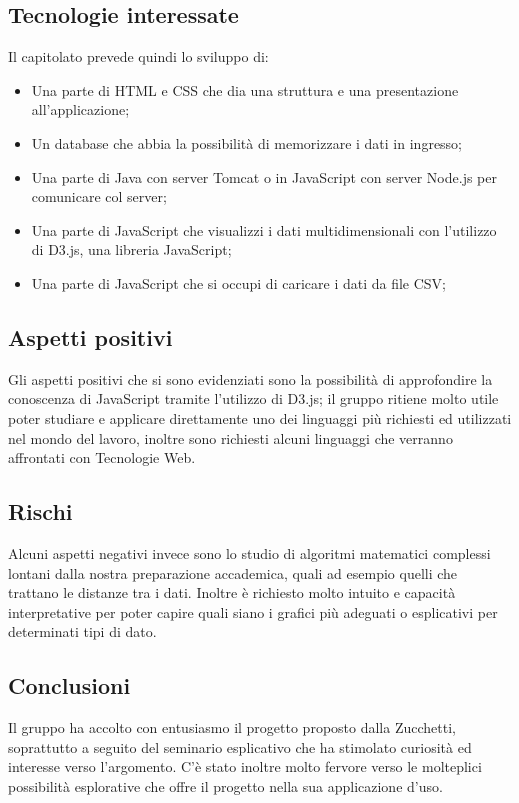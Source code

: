 \documentclass[../studio-di-fattibilita.tex]{subfiles}
\begin{document}
\subsection{Tecnologie interessate}%
\label{sub:c4_tecnologie_interessate}
Il capitolato prevede quindi lo sviluppo di:
\begin{itemize}
  \item Una parte di HTML e CSS che dia una struttura e una presentazione all’applicazione;
  \item Un database che abbia la possibilità di memorizzare i dati in ingresso;
  \item Una parte di Java con server Tomcat o in JavaScript con server Node.js per comunicare col server;
  \item Una parte di JavaScript che visualizzi i dati multidimensionali con l'utilizzo di D3.js, una libreria JavaScript;
  \item Una parte di JavaScript che si occupi di caricare i dati da file CSV;
\end{itemize}

\subsection{Aspetti positivi}%
\label{sub:c4_aspetti_positivi}
Gli aspetti positivi che si sono evidenziati sono la possibilità di approfondire la conoscenza di JavaScript tramite l’utilizzo di D3.js; il gruppo ritiene molto utile poter studiare e applicare direttamente uno dei linguaggi più richiesti ed utilizzati nel mondo del lavoro, inoltre sono richiesti alcuni linguaggi che verranno affrontati con Tecnologie Web.


\subsection{Rischi}%
\label{sub:c4_rischi}
Alcuni aspetti negativi invece sono lo studio di algoritmi matematici complessi lontani dalla nostra preparazione accademica, quali ad esempio quelli che trattano le distanze tra i dati. Inoltre è richiesto molto intuito e capacità interpretative per poter capire quali siano i grafici più adeguati o esplicativi per determinati tipi di dato.

\subsection{Conclusioni}%
\label{sub:c4_conclusioni}
Il gruppo ha accolto con entusiasmo il progetto proposto dalla Zucchetti, soprattutto a seguito del seminario esplicativo che ha stimolato curiosità ed interesse verso l’argomento. C’è stato inoltre molto fervore verso le molteplici possibilità esplorative che offre il progetto nella sua applicazione d’uso.
\end{document}
